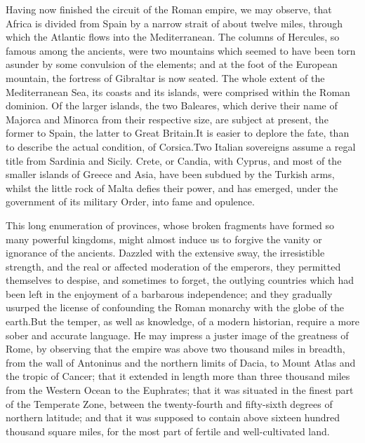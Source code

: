 Having now finished the circuit of the Roman empire, we may
observe, that Africa is divided from Spain by a narrow strait of
about twelve miles, through which the Atlantic flows into the
Mediterranean. The columns of Hercules, so famous among the
ancients, were two mountains which seemed to have been torn
asunder by some convulsion of the elements; and at the foot of
the European mountain, the fortress of Gibraltar is now seated.
The whole extent of the Mediterranean Sea, its coasts and its
islands, were comprised within the Roman dominion. Of the larger
islands, the two Baleares, which derive their name of Majorca and
Minorca from their respective size, are subject at present, the
former to Spain, the latter to Great Britain.\footnotemark[871] It is easier to
deplore the fate, than to describe the actual condition, of
Corsica.\footnotemark[872] Two Italian sovereigns assume a regal title from
Sardinia and Sicily. Crete, or Candia, with Cyprus, and most of
the smaller islands of Greece and Asia, have been subdued by the
Turkish arms, whilst the little rock of Malta defies their power,
and has emerged, under the government of its military Order, into
fame and opulence.\footnotemark[873]




This long enumeration of provinces, whose broken fragments have
formed so many powerful kingdoms, might almost induce us to
forgive the vanity or ignorance of the ancients. Dazzled with the
extensive sway, the irresistible strength, and the real or
affected moderation of the emperors, they permitted themselves to
despise, and sometimes to forget, the outlying countries which
had been left in the enjoyment of a barbarous independence; and
they gradually usurped the license of confounding the Roman
monarchy with the globe of the earth.\footnotemark[88] But the temper, as well
as knowledge, of a modern historian, require a more sober and
accurate language. He may impress a juster image of the greatness
of Rome, by observing that the empire was above two thousand
miles in breadth, from the wall of Antoninus and the northern
limits of Dacia, to Mount Atlas and the tropic of Cancer; that it
extended in length more than three thousand miles from the
Western Ocean to the Euphrates; that it was situated in the
finest part of the Temperate Zone, between the twenty-fourth and
fifty-sixth degrees of northern latitude; and that it was
supposed to contain above sixteen hundred thousand square miles,
for the most part of fertile and well-cultivated land.\footnotemark[89]



